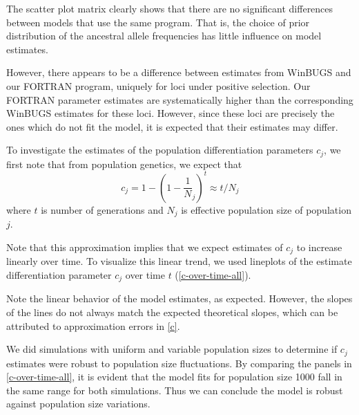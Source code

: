 \documentclass[a4paper,12pt]{article}
\begin{document}

The scatter plot matrix clearly shows that there are no significant
differences between models that use the same program. That is, the
choice of prior distribution of the ancestral allele frequencies has
little influence on model estimates.

However, there appears to be a difference between estimates from
WinBUGS and our FORTRAN program, uniquely for loci under positive
selection. Our FORTRAN parameter estimates are systematically higher
than the corresponding WinBUGS estimates for these loci. However,
since these loci are precisely the ones which do not fit the model, it
is expected that their estimates may differ.

To investigate the estimates of the population differentiation
parameters $c_j$, we first note that from population genetics, we
expect that
\begin{equation}
  \label{c}
 c_j = 1 - (1 - \frac 1 N_j)^t\approx t/N_j  
\end{equation}
where $t$ is number of generations and $N_j$ is effective population
size of population $j$.

Note that this approximation implies that we expect estimates of $c_j$
to increase linearly over time. To visualize this linear trend, we
used lineplots of the estimate differentiation parameter $c_j$ over
time $t$ (\autoref{c-over-time-all}).


Note the linear behavior of the model estimates, as expected. However,
the slopes of the lines do not always match the expected theoretical
slopes, which can be attributed to approximation errors in
\autoref{c}.

We did simulations with uniform and variable population sizes to
determine if $c_j$ estimates were robust to population size
fluctuations. By comparing the panels in \autoref{c-over-time-all}, it
is evident that the model fits for population size 1000 fall in the
same range for both simulations. Thus we can conclude the model is
robust against population size variations.
\end{document}
